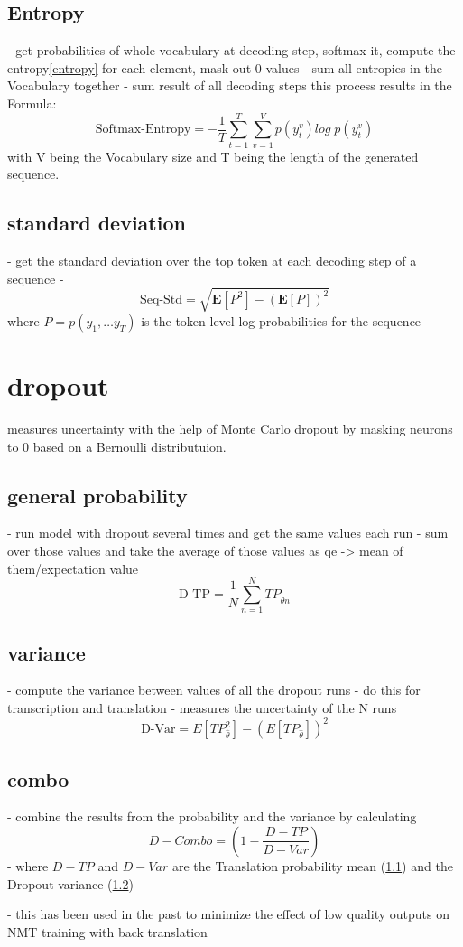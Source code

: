 \subsection{Entropy}
- get probabilities of whole vocabulary at decoding step, softmax it, compute the entropy\ref{entropy} for each element, mask out 0 values 
- sum all entropies in the Vocabulary together
- sum result of all decoding steps
this process results in the Formula:
$$\text{Softmax-Entropy}=-\frac{1}{T}\sum_{t=1}^T\sum_{v=1}^V p(y_t^v)log\; p(y_t^v) \label{formula:translation probability}$$ with V being the Vocabulary size and T being the length of the generated sequence.

\subsection{standard deviation}
- get the standard deviation over the top token at each decoding step of a sequence
- $$\text{Seq-Std}=\sqrt{\mathbf{E}[P^2]-(\mathbf{E}[P])^2}$$ where $P=p(y_1 , \dots y_T)$ is the token-level log-probabilities for the sequence


\section{dropout}
measures uncertainty with the help of Monte Carlo dropout \cite{gal2016dropoutbayesianapproximationrepresenting} by masking neurons to 0 based on a Bernoulli distributuion. 
\subsection{general probability}
\label{dropoutprob}
- run model with dropout several times and get the same values each run 
- sum over those values and take the average of those values as qe -> mean of them/expectation value
$$\text{D-TP}=\frac{1}{N}\sum_{n=1}^N TP_{\hat\theta n}$$


\subsection{variance}
\label{dropoutvar}
- compute the variance between values of all the dropout runs 
- do this for transcription and translation 
- measures the uncertainty of the N runs 
$$\text{D-Var}=E[TP_{\hat\theta}^2]-(E[TP_{\hat\theta}])^2$$

\subsection{combo}
- combine the results from the probability and the variance by calculating $$D-Combo=(1-\frac{D-TP}{D-Var})$$
- where $D-TP$ and $D-Var$ are the Translation probability mean (\ref{dropoutprob}) and the Dropout variance (\ref{dropoutvar})

- this has been used in the past to minimize the effect of low quality outputs on NMT training with back translation \cite{wang-etal-2018-alibaba} 


